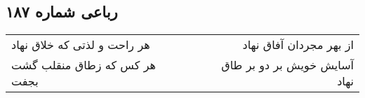 \begin{center}
\section*{رباعی شماره ۱۸۷}
\label{sec:sh187}
\begin{longtable}{l p{0.5cm} r}
هر راحت و لذتی که خلاق نهاد
&&
از بهر مجردان آفاق نهاد
\\
هر کس که زطاق منقلب گشت بجفت
&&
آسایش خویش بر دو بر طاق نهاد
\\
\end{longtable}
\end{center}
